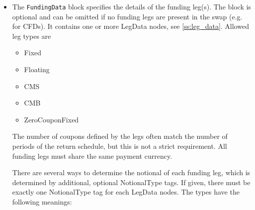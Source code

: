 \begin{itemize}
\begin{itemize}
With the FXConversion \emph{End}  the accrual pricing return is:\\
(Ntl x todays price x today's Fx rate) - (Ntl x initial price x today's Fx rate)\\
When the as of date is the date of the final price (end of period) we have:\\
(Ntl x final price x final Fx rate) - (Ntl x initial price x final Fx rate)

Allowable values: \emph{Start}, \emph{End}. Defaults to \emph{Start} if omitted.

  \item PayUnderlyingCashFlowsImmediately [Optional]: If true, underlying cashflows like coupon or amortisation payments
    from bonds or dividend payments from equities, are paid when they occur. If false, these cashflows are paid together
    with the next return payment. If omitted, the default value is false for trade type TotalReturnSwap and true for
    trade type ContractForDifference.

  Allowable values: true (immediate payment of underlying cashflwos) or false (underlying cashflows are paid on the next
                    return payment date)

\end{itemize}

\item The {\tt FundingData} block specifies the details of the funding leg(s). The block is optional and can be omitted
  if no funding legs are present in the swap (e.g. for CFDs). It contains one or more LegData nodes, see
  \ref{ss:leg_data}. Allowed leg types are
  \begin{itemize}
  \item Fixed
  \item Floating
  \item CMS
  \item CMB
  \item ZeroCouponFixed
  \end{itemize}
  The number of coupons defined by the legs often match the number of periods of the return schedule, but this is not a
  strict requirement. All funding legs must share the same payment currency.

  There are several ways to determine the notional of each funding leg, which is determined by additional, optional
  NotionalType tags. If given, there must be exactly one NotionalType tag for each LegData nodes. The types have the
  following meanings:


\end{itemize}
